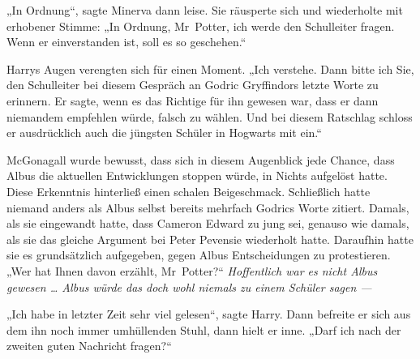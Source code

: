 „In Ordnung“, sagte Minerva dann leise. Sie räusperte sich und wiederholte mit erhobener Stimme:
„In Ordnung, Mr~Potter, ich werde den Schulleiter fragen. Wenn er einverstanden ist, soll es so geschehen.“

Harrys Augen verengten sich für einen Moment.
„Ich verstehe. Dann bitte ich Sie, den Schulleiter bei diesem Gespräch an Godric Gryffindors letzte Worte zu erinnern. Er sagte, wenn es das Richtige für ihn gewesen war, dass er dann niemandem empfehlen würde, falsch zu wählen. Und bei diesem Ratschlag schloss er ausdrücklich auch die jüngsten Schüler in Hogwarts mit ein.“

McGonagall wurde bewusst, dass sich in diesem Augenblick jede Chance, dass Albus die aktuellen Entwicklungen stoppen würde, in Nichts aufgelöst hatte. Diese Erkenntnis hinterließ einen schalen Beigeschmack. Schließlich hatte niemand anders als Albus selbst bereits mehrfach Godrics Worte zitiert. Damals, als sie eingewandt hatte, dass Cameron Edward zu jung sei, genauso wie damals, als sie das gleiche Argument bei Peter Pevensie wiederholt hatte. Daraufhin hatte sie es grundsätzlich aufgegeben, gegen Albus Entscheidungen zu protestieren.
„Wer hat Ihnen davon erzählt, Mr~Potter?“ \emph{Hoffentlich war es nicht Albus gewesen … Albus würde das doch wohl niemals zu einem Schüler \emph{sagen} —}

„Ich habe in letzter Zeit sehr viel gelesen“, sagte Harry. Dann befreite er sich aus dem ihn noch immer umhüllenden Stuhl, dann hielt er inne.
„Darf ich nach der zweiten guten Nachricht fragen?“

